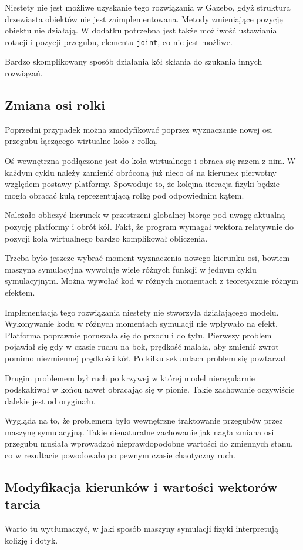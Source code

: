 Niestety nie jest możliwe uzyskanie tego rozwiązania w Gazebo, gdyż struktura drzewiasta obiektów nie jest zaimplementowana.
Metody zmieniające pozycję obiektu nie działają.
W dodatku potrzebna jest także możliwość ustawiania rotacji i pozycji przegubu, elementu \texttt{joint}, co nie jest możliwe.

Bardzo skomplikowany sposób działania kół skłania do szukania innych rozwiązań.

\subsection{Zmiana osi rolki}
Poprzedni przypadek można zmodyfikować poprzez wyznaczanie nowej osi przegubu łączącego wirtualne koło z rolką.

Oś wewnętrzna podłączone jest do koła wirtualnego i obraca się razem z nim.
W każdym cyklu należy zamienić obróconą już nieco oś na kierunek pierwotny względem postawy platformy.
Spowoduje to, że kolejna iteracja fizyki będzie mogła obracać kulą reprezentującą rolkę pod odpowiednim kątem.

Należało obliczyć kierunek w przestrzeni globalnej biorąc pod uwagę aktualną pozycję platformy i obrót kół.
Fakt, że program wymagał wektora relatywnie do pozycji koła wirtualnego bardzo komplikował obliczenia.

Trzeba było jeszcze wybrać moment wyznaczenia nowego kierunku osi, bowiem maszyna symulacyjna wywołuje wiele różnych funkcji w jednym cyklu symulacyjnym.
Można wywołać kod w różnych momentach z teoretycznie różnym efektem. 

Implementacja tego rozwiązania niestety nie stworzyła działającego modelu.
Wykonywanie kodu w różnych momentach symulacji nie wpływało na efekt.
Platforma poprawnie poruszała się do przodu i do tyłu. 
Pierwszy problem pojawiał się gdy w czasie ruchu na bok, prędkość malała, aby zmienić zwrot pomimo niezmiennej prędkości kół.
Po kilku sekundach problem się powtarzał.

Drugim problemem był ruch po krzywej w której model nieregularnie podskakiwał w końcu nawet obracając się w pionie.
Takie zachowanie oczywiście dalekie jest od oryginału.

Wygląda na to, że problemem było wewnętrzne traktowanie przegubów przez maszynę symulacyjną.
Takie nienaturalne zachowanie jak nagła zmiana osi przegubu musiała wprowadzać nieprawdopodobne wartości do zmiennych stanu, co w rezultacie powodowało po pewnym czasie chaotyczny ruch.

\subsection{Modyfikacja kierunków i wartości wektorów tarcia}
Warto tu wytłumaczyć, w jaki sposób maszyny symulacji fizyki interpretują kolizję i dotyk.

